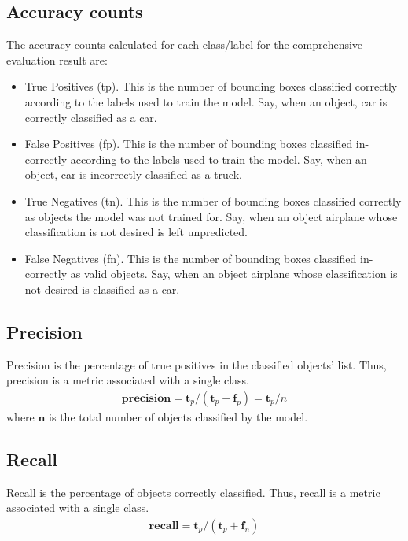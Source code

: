 \documentclass[conference]{IEEEtran}
\begin{document}
\subsection{Accuracy counts}
The accuracy counts calculated for each class/label for the comprehensive evaluation result are:
\begin{itemize}
	\item True Positives (tp). 
	This is the number of bounding boxes classified correctly according to the labels used to train the model. Say, when an object, car is correctly classified as a car.
	\item False Positives (fp).
	This is the number of bounding boxes classified in-correctly according to the labels used to train the model. Say, when an object, car is incorrectly classified as a truck.
	\item True Negatives (tn).
	This is the number of bounding boxes classified correctly as objects the model was not trained for. Say, when an object airplane whose classification is not desired is left unpredicted.
	\item False Negatives (fn).
	This is the number of bounding boxes classified in-correctly as valid objects. Say, when an object airplane whose classification is not desired is classified as a car.
\end{itemize}

\subsection{Precision}
	Precision is the percentage of true positives in the classified objects' list. Thus, precision is a metric associated with a single class.
	\begin{align}
	\mathbf{precision}=\mathbf{t}_p / (\mathbf{t}_p + \mathbf{f}_p) = \mathbf{t}_p / {n}
	\end{align}
	where $\mathbf{n}$ is the total number of objects classified by the model.
\subsection{Recall}
	Recall is the percentage of objects correctly classified. Thus, recall is a metric associated with a single class.
	\begin{align}
	\mathbf{recall}=\mathbf{t}_p / (\mathbf{t}_p + \mathbf{f}_n)
	\end{align}
\end{document}

